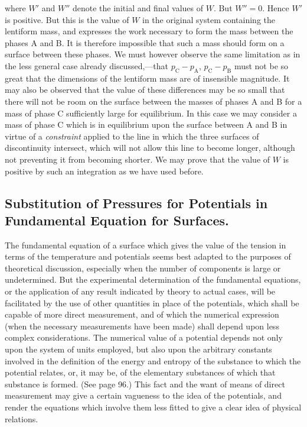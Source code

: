 \documentclass[12pt]{article}
\begin{document}
{where $W'$ and $W''$ denote the initial and final values of $W$. But $W''=0$. Hence $W'$ is positive. But this is the value of $W$ in the original system containing the lentiform mass, and expresses the work necessary to form the mass between the phases A and B. It is therefore impossible that such a mass should form on a surface between these phases. We must however observe the same limitation as in the less general case already discussed,---that $p_\text{C}-p_\text{A}$, $p_\text{C}-p_\text{B}$ must not be so great that the dimensions of the lentiform mass are of insensible magnitude. It may also be observed that the value of these differences may be so small that there will not be room on the surface between the masses of phases A and B for a mass of phase C sufficiently large for equilibrium. In this case we may consider a mass of phase C which is in equilibrium upon the surface between A and B in virtue of a \textit{constraint} applied to the line in which the three surfaces of discontinuity intersect, which will not allow this line to become longer, although not preventing it from becoming shorter. We may prove that the value of $W$ is positive by such an integration as we have used before.


\subsection{Substitution of Pressures for Potentials in Fundamental Equation for Surfaces.}
The fundamental equation of a surface which gives the value of the tension in terms of the temperature and potentials seems best adapted to the purposes of theoretical discussion, especially when the number of components is large or undetermined. But the experimental determination of the fundamental equations, or the application of any result indicated by theory to actual cases, will be facilitated by the use of other quantities in place of the potentials, which shall be capable of more direct measurement, and of which the numerical expression (when the necessary measurements have been made) shall depend upon less complex considerations. The numerical value of a potential depends not only upon the system of units employed, but also upon the arbitrary constants involved in the definition of the energy and entropy of the substance to which the potential relates, or, it may be, of the elementary substances of which that substance is formed. (See page 96.) This fact and the want of means of direct measurement may give a certain vagueness to the idea of the potentials, and render the equations which involve them less fitted to give a clear idea of physical relations.

}
\end{document}
